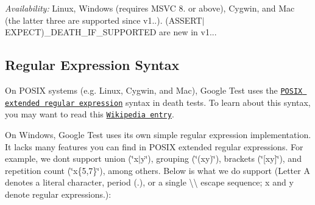 {\itshape Availability\+:} Linux, Windows (requires M\+S\+VC 8. or above), Cygwin, and Mac (the latter three are supported since v1..). {\ttfamily (A\+S\+S\+E\+R\+T$\vert$\+E\+X\+P\+E\+CT)\+\_\+\+D\+E\+A\+T\+H\+\_\+\+I\+F\+\_\+\+S\+U\+P\+P\+O\+R\+T\+ED} are new in v1...

\subsection*{Regular Expression Syntax}

On P\+O\+S\+IX systems (e.\+g. Linux, Cygwin, and Mac), Google Test uses the \href{http://www.opengroup.org/onlinepubs/009695399/basedefs/xbd_chap09.html#tag_09_04}{\tt P\+O\+S\+IX extended regular expression} syntax in death tests. To learn about this syntax, you may want to read this \href{http://en.wikipedia.org/wiki/Regular_expression#POSIX_Extended_Regular_Expressions}{\tt Wikipedia entry}.

On Windows, Google Test uses its own simple regular expression implementation. It lacks many features you can find in P\+O\+S\+IX extended regular expressions. For example, we don\textquotesingle{}t support union ({\ttfamily \char`\"{}x$\vert$y\char`\"{}}), grouping ({\ttfamily \char`\"{}(xy)\char`\"{}}), brackets ({\ttfamily \char`\"{}\mbox{[}xy\mbox{]}\char`\"{}}), and repetition count ({\ttfamily \char`\"{}x\{5,7\}\char`\"{}}), among others. Below is what we do support (Letter {\ttfamily A} denotes a literal character, period ({\ttfamily .}), or a single {\ttfamily \textbackslash{}\textbackslash{}} escape sequence; {\ttfamily x} and {\ttfamily y} denote regular expressions.)\+:

